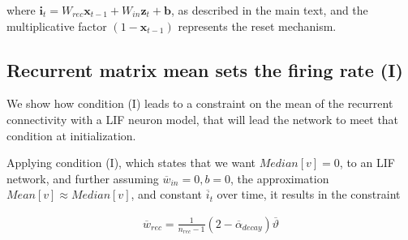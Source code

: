\noindent where $\boldsymbol{i}_{t}=W_{rec}\boldsymbol{x}_{t-1} + W_{in}\boldsymbol{z}_t + \boldsymbol{b}$, as described in the main text, and the multiplicative factor $(1-\boldsymbol{x}_{t-1})$ represents the reset mechanism.

\subsection{Recurrent matrix mean sets the firing rate (I)}

\label{app:means}

We show how condition (I) leads to a constraint on the mean of the recurrent connectivity with a LIF neuron model, that will lead the network to meet that condition at initialization.



\begin{lemma}\label{thm:cI}
Applying condition (I), which states that we want
$Median[v] = 0$, to an LIF network, and further assuming
$\overline{w}_{in} = 0, b = 0$, the approximation $Mean[v] \approx Median[v]$,
and constant $\overline{i}_t$ over time, it results in the constraint

\begin{align}
    \overline{w}_{rec}=\frac{1}{n_{rec}-1}(2-\overline{\alpha}_{decay})\overline{\vartheta}
\end{align}

\end{lemma}


